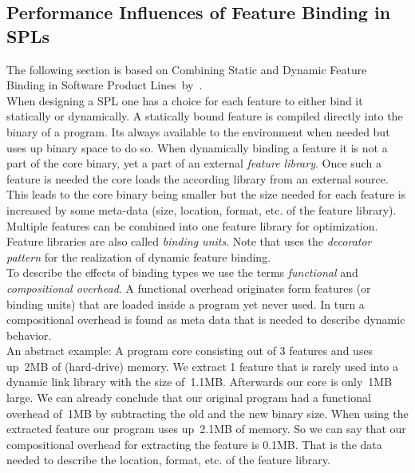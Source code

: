 \subsection{Performance Influences of Feature Binding in SPLs}

The following section is based on Combining Static and Dynamic Feature Binding in Software Product Lines~by~\citet{CombiningStaticandDynamicFeatureBinding}.\\
When designing a SPL one has a choice for each feature to either bind it statically or dynamically.
A statically bound feature is compiled directly into the binary of a program. Its always available to the environment when needed but uses up binary space to do so.
When dynamically binding a feature it is not a part of the core binary, yet a part of an external \textit{feature library}. Once such a feature is needed the core loads the according library from an external source. This leads to the core binary being smaller but the size needed for each feature is increased by some meta-data (size, location, format, etc. of the feature library). Multiple features can be combined into one feature library for optimization. Feature libraries are also called \textit{binding units}. Note that \cite{CombiningStaticandDynamicFeatureBinding} uses the \textit{decorator pattern} for the realization of dynamic feature binding.\\
To describe the effects of binding types we use the terms \textit{functional} and \textit{compositional overhead}. A functional overhead  originates form features (or binding units) that are loaded inside a program yet never used. In turn a compositional overhead is found as meta data that is needed to describe dynamic behavior.\\An abstract example: A program core consisting out of 3 features and uses up~2MB of (hard-drive) memory. We extract 1 feature that is rarely used into a dynamic link library with the size of~1.1MB. Afterwards our core is only~1MB large. We can already conclude that our original program had a functional overhead of~1MB by subtracting the old and the new binary size. When using the extracted feature our program uses up~2.1MB of memory. So we can say that our compositional overhead for extracting the feature is 0.1MB. That is the data needed to describe the location, format, etc. of the feature library.\\
